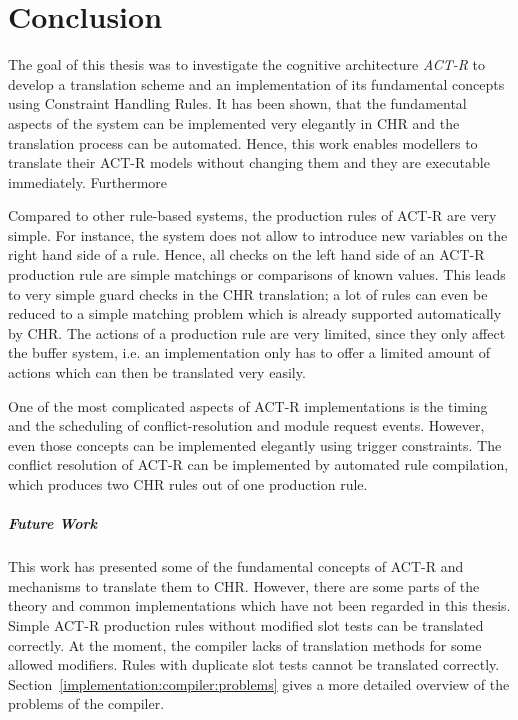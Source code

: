 \chapter{Conclusion}
\label{conclusion}

The goal of this thesis was to investigate the cognitive architecture \emph{ACT-R} to develop a translation scheme and an implementation of its fundamental concepts using Constraint Handling Rules. It has been shown, that the fundamental aspects of the system can be implemented very elegantly in CHR and the translation process can be automated. Hence, this work enables modellers to translate their ACT-R models without changing them and they are executable immediately. Furthermore  


Compared to other rule-based systems, the production rules of ACT-R are very simple. For instance, the system does not allow to introduce new variables on the right hand side of a rule. Hence, all checks on the left hand side of an ACT-R production rule are simple matchings or comparisons of known values. This leads to very simple guard checks in the CHR translation; a lot of rules can even be reduced to a simple matching problem which is already supported automatically by CHR. The actions of a production rule are very limited, since they only affect the buffer system, i.e. an implementation only has to offer a limited amount of actions which can then be translated very easily.

One of the most complicated aspects of ACT-R implementations is the timing and the scheduling of conflict-resolution and module request events. However, even those concepts can be implemented elegantly using trigger constraints. The conflict resolution of ACT-R can be implemented by automated rule compilation, which produces two CHR rules out of one production rule.

\paragraph{Future Work}

This work has presented some of the fundamental concepts of ACT-R and mechanisms to translate them to CHR. However, there are some parts of the theory and common implementations which have not been regarded in this thesis. Simple ACT-R production rules without modified slot tests can be translated correctly. At the moment, the compiler lacks of translation methods for some allowed modifiers. Rules with duplicate slot tests cannot be translated correctly. Section~\ref{implementation:compiler:problems} gives a more detailed overview of the problems of the compiler.

